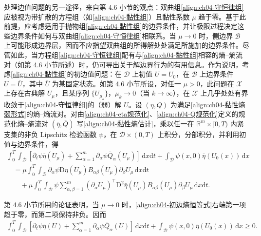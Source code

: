 \documentclass[../../main.tex]{subfiles}
\begin{document}
处理边值问题的另一途径，来自第 4.6 小节的观点：双曲组\eqref{align:ch04-守恒律组}应被视为带扩散的方程组（如\eqref{align:ch04-黏性组}）且黏性系数 $\mu$ 趋于零。基于此前提，应考虑适用于抛物组\eqref{align:ch04-黏性组}的边界条件，并让极限过程决定这些边界条件如何与双曲组\eqref{align:ch04-守恒律组}相联系。当 $\mu\to 0$ 时，侧边界 $\mathscr{B}$ 上可能形成边界层，因而不应指望双曲组的所得解处处满足所施加的边界条件。尽管如此，当方程组\eqref{align:ch04-守恒律组}配有与\eqref{align:ch04-黏性组}相容的熵--熵流对（如第 4.6 小节所述）时，仍可导出关于解边界行为的有用信息。作为说明，考虑\eqref{align:ch04-黏性组}的初边值问题：在 $\mathscr{D}$ 上初值 $U=U_{0}$，在 $\mathscr{B}$ 上边界条件 $U=\bar{U}$，其中 $\bar{U}$ 为某固定状态。如第 4.6 小节所设，对任一 $\mu>0$，此问题在 $\mathscr{X}$ 上存在古典解 $U_{\mu}$，且某序列 $\{U_{\mu_{k}}\}$，$\mu_{k}\to 0$（当 $k\to\infty$），在 $\mathscr{X}$ 上几乎处处有界收敛于\eqref{align:ch04-守恒律组}的（弱）解 $U$。设 $(\eta,Q)$ 为满足\eqref{align:ch04-黏性熵弱形式}的熵--熵流对。对由\eqref{align:ch04-eta规范化}、\eqref{align:ch04-Q规范化}定义的规范化熵--熵流对 $(\bar{\eta},\bar{Q})$ 写\eqref{align:ch04-黏性熵估计}，乘以任一在 $\mathbb{R}^{m}\times[0,T)$ 内紧支集的非负 Lipschitz 检验函数 $\psi$，在 $\mathscr{D}\times(0,T)$ 上积分，分部积分，并利用初值与边界条件，得
\begin{align}
\int_{0}^{T}\int_{\mathscr{D}}\left[\partial_{t}\psi\bar{\eta}(U_{\mu})+\sum_{\alpha=1}^{m}\partial_{\alpha}\psi\bar{Q}_{\alpha}(U_{\mu})\right]\,\mathrm{d}x\mathrm{d}t+\int_{\mathscr{D}}\psi(x,0)\bar{\eta}(U_{0}(x))\,\mathrm{d}x\nonumber\\
\quad=\mu\int_{0}^{T}\int_{\mathscr{D}}\partial_{\alpha}\psi\mathrm{D}\bar{\eta}(U_{\mu})B_{\alpha\beta}(U_{\mu})\partial_{\beta}U_{\mu}\,\mathrm{d}x\mathrm{d}t\nonumber\\
\qquad+\mu\int_{0}^{T}\int_{\mathscr{D}}\psi\sum_{\alpha,\beta=1}^{m}(\partial_{\alpha}U_{\mu})^{\top}\mathrm{D}^{2}\bar{\eta}(U_{\mu})B_{\alpha\beta}(U_{\mu})\partial_{\beta}U_{\mu}\,\mathrm{d}x\mathrm{d}t.
\label{align:ch04-初边熵恒等式}
\end{align}

第 4.6 小节所用的论证表明，当 $\mu\to 0$ 时，\eqref{align:ch04-初边熵恒等式}右端第一项趋于零，而第二项保持非负。因而
\begin{align}
\int_{0}^{T}\int_{\mathscr{D}}\left[\partial_{t}\psi\bar{\eta}(U)+\sum_{\alpha=1}^{m}\partial_{\alpha}\psi\bar{Q}_{\alpha}(U)\right]\,\mathrm{d}x\mathrm{d}t+\int_{\mathscr{D}}\psi(x,0)\bar{\eta}(U_{0}(x))\,\mathrm{d}x\geqslant 0.
\label{align:ch04-初边熵不等式}
\end{align}
\end{document}
